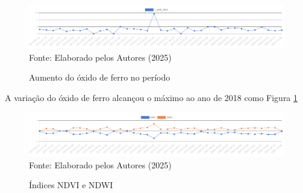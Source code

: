  \begin{figure}[H]
	\centering  \small \caption{Aumento do óxido de ferro no período}
	\includegraphics[width=0.97\linewidth]{FIGURAS/graphvisualiser-1747928533564}
	\label{fig:INDICES2}{ Fonte:   Elaborado pelos Autores (2025)}
\end{figure}

\hspace*{1.25 cm} A variação do óxido de ferro alcançou o máximo ao ano de 2018 como Figura \ref{fig:INDICES2}\\
%
\begin{figure}[H]
	\centering  \small \caption{Índices NDVI e NDWI}
	\includegraphics[width=0.97\linewidth]{FIGURAS/graphvisualiser-1747928457345}
	\label{fig:INDICES3}{ Fonte:   Elaborado pelos Autores (2025)}
\end{figure}


